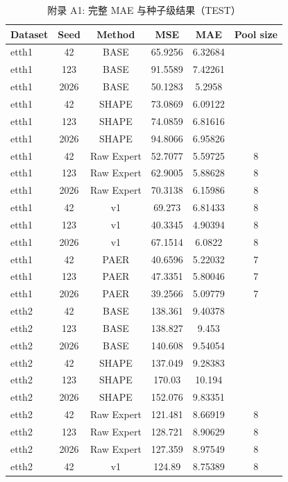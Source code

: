 \begin{table}[htbp]
  \centering
  \caption{附录 A1: 完整 MAE 与种子级结果（TEST）}
  \label{tab:appendix_mae}
  \begin{tabular}{lccccc}
    \toprule
    Dataset & Seed & Method & MSE & MAE & Pool size \\
    \midrule
    etth1 & 42 & BASE & 65.9256 & 6.32684 &  \\
    etth1 & 123 & BASE & 91.5589 & 7.42261 &  \\
    etth1 & 2026 & BASE & 50.1283 & 5.2958 &  \\
    etth1 & 42 & SHAPE & 73.0869 & 6.09122 &  \\
    etth1 & 123 & SHAPE & 74.0859 & 6.81616 &  \\
    etth1 & 2026 & SHAPE & 94.8066 & 6.95826 &  \\
    etth1 & 42 & Raw Expert & 52.7077 & 5.59725 & 8 \\
    etth1 & 123 & Raw Expert & 62.9005 & 5.88628 & 8 \\
    etth1 & 2026 & Raw Expert & 70.3138 & 6.15986 & 8 \\
    etth1 & 42 & v1 & 69.273 & 6.81433 & 8 \\
    etth1 & 123 & v1 & 40.3345 & 4.90394 & 8 \\
    etth1 & 2026 & v1 & 67.1514 & 6.0822 & 8 \\
    etth1 & 42 & PAER & 40.6596 & 5.22032 & 7 \\
    etth1 & 123 & PAER & 47.3351 & 5.80046 & 7 \\
    etth1 & 2026 & PAER & 39.2566 & 5.09779 & 7 \\
    etth2 & 42 & BASE & 138.361 & 9.40378 &  \\
    etth2 & 123 & BASE & 138.827 & 9.453 &  \\
    etth2 & 2026 & BASE & 140.608 & 9.54054 &  \\
    etth2 & 42 & SHAPE & 137.049 & 9.28383 &  \\
    etth2 & 123 & SHAPE & 170.03 & 10.194 &  \\
    etth2 & 2026 & SHAPE & 152.076 & 9.83351 &  \\
    etth2 & 42 & Raw Expert & 121.481 & 8.66919 & 8 \\
    etth2 & 123 & Raw Expert & 128.721 & 8.90629 & 8 \\
    etth2 & 2026 & Raw Expert & 127.359 & 8.97549 & 8 \\
    etth2 & 42 & v1 & 124.89 & 8.75389 & 8 \\

\end{tabular}
\end{table}
